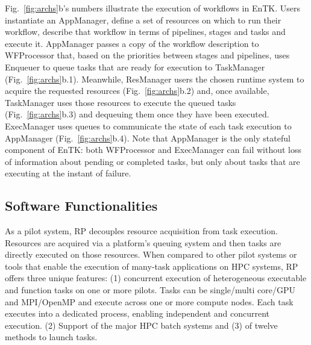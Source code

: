 \documentclass[preprint,12pt, a4paper]{elsarticle}
\begin{document}
Fig.~\ref{fig:archs}b's numbers illustrate the execution of workflows in
EnTK\@. Users instantiate an AppManager, %
define a set of resources on which to run their workflow,
describe that workflow in terms of pipelines, stages and tasks
and execute it.
AppManager passes a copy of the workflow description to WFProcessor that, based
on the priorities between stages and pipelines, uses Enqueuer to queue tasks
that are ready for execution to TaskManager (Fig.~\ref{fig:archs}b.1).
Meanwhile, ResManager users the chosen runtime system to acquire the requested
resources (Fig.~\ref{fig:archs}b.2) and, once available, TaskManager uses those
resources to execute the queued tasks (Fig.~\ref{fig:archs}b.3) and dequeuing
them once they have been executed. ExecManager uses queues to communicate the
state of each task execution to AppManager (Fig.~\ref{fig:archs}b.4). Note that
AppManager is the only stateful component of EnTK\@: both WFProcessor and
ExecManager can fail without loss of information about pending or completed
tasks, but only about tasks that are executing at the instant of failure.

\subsection{Software Functionalities}\label{ssec:functionalities}


As a pilot system, RP decouples resource acquisition from task execution.
Resources are acquired via a platform's queuing system and then tasks are
directly executed on those resources.
%
%
When compared to other pilot systems or tools that enable the execution of
many-task applications on HPC systems, RP offers three unique features: (1)
concurrent execution of heterogeneous executable and function tasks on one or
more pilots. Tasks can be single/multi core/GPU and MPI/OpenMP and execute
across one or more compute nodes. Each task executes into a dedicated process,
enabling independent and concurrent execution. (2) Support of the major HPC
batch systems and (3) of twelve methods to launch tasks.
\end{document}
